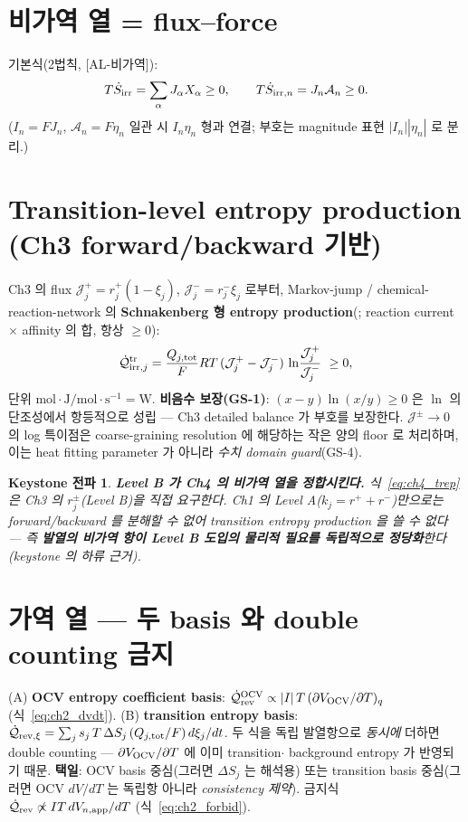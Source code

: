 \documentclass[11pt,a4paper]{article}
\newtheorem*{keybox}{Keystone 전파}
\newcommand{\rev}{\mathrm{rev}}\newcommand{\ct}{\mathrm{ct}}\newcommand{\AL}[1]{\textsf{[AL-#1]}}
\begin{document}
\section{비가역 열 = flux--force}\label{sec:ch4_irr}
기본식(2법칙, \AL{비가역}):
\begin{equation}
T\dot S_{\mathrm{irr}}=\sum_\alpha J_\alpha X_\alpha\ge0,\qquad
T\dot S_{\mathrm{irr},n}=J_n\mathcal A_n\ge0 .
\label{eq:ch4_JA}
\end{equation}
($I_n=FJ_n$, $\mathcal A_n=F\eta_n$ 일관 시 $I_n\eta_n$ 형과 연결; 부호는 magnitude 표현
$|I_n||\eta_n|$ 로 분리.)

\section{Transition-level entropy production (Ch3 forward/backward 기반)}\label{sec:ch4_trep}
Ch3 의 flux $\mathcal J_j^+=r_j^+(1-\xi_j)$, $\mathcal J_j^-=r_j^-\xi_j$ 로부터, Markov-jump / chemical-
reaction-network 의 \textbf{Schnakenberg 형 entropy production}(\cite{schnakenberg1976}; reaction current
$\times$ affinity 의 합, 항상 $\ge0$):
\begin{equation}
\dot{\mathcal Q}_{\mathrm{irr},j}^{\mathrm{tr}}=\frac{Q_{j,\mathrm{tot}}}{F}RT\,(\mathcal J_j^+-\mathcal J_j^-)\,
\ln\!\frac{\mathcal J_j^+}{\mathcal J_j^-}\ \ge 0,
\label{eq:ch4_trep}
\end{equation}
단위 $\mathrm{mol}\cdot\mathrm{J/mol}\cdot\mathrm{s^{-1}}=\mathrm W$. \textbf{비음수 보장(GS-1)}:
$(x-y)\ln(x/y)\ge0$ 은 $\ln$ 의 단조성에서 항등적으로 성립 — Ch3 detailed balance 가 부호를 보장한다.
$\mathcal J^\pm\to0$ 의 log 특이점은 coarse-graining resolution 에 해당하는 작은 양의 floor 로 처리하며,
이는 heat fitting parameter 가 아니라 \emph{수치 domain guard}(GS-4).

\begin{keybox}
\textbf{Level B 가 Ch4 의 비가역 열을 정합시킨다.} 식~\eqref{eq:ch4_trep} 은 Ch3 의 $r_j^\pm$(Level B)을
직접 요구한다. Ch1 의 Level A($k_j=r^++r^-$)만으로는 forward/backward 를 분해할 수 없어 transition
entropy production 을 쓸 수 없다 — 즉 \textbf{발열의 비가역 항이 Level B 도입의 물리적 필요를
독립적으로 정당화}한다(keystone 의 하류 근거).
\end{keybox}

\section{가역 열 — 두 basis 와 double counting 금지}\label{sec:ch4_double}
(A) \textbf{OCV entropy coefficient basis}: $\dot{\mathcal Q}_\rev^{\OCV}\propto |I|\,T\,(\partial V_\OCV/\partial T)_q$
(식~\eqref{eq:ch2_dvdt}). (B) \textbf{transition entropy basis}:
$\dot{\mathcal Q}_{\rev,\xi}=\sum_j s_j\,T\,\Delta S_j\,(Q_{j,\tot}/F)\,d\xi_j/dt$. 두 식을 독립
발열항으로 \emph{동시에} 더하면 double counting — $\partial V_{\mathrm{OCV}}/\partial T$ 에 이미 transition$\cdot$
background entropy 가 반영되기 때문. \textbf{택일}: OCV basis 중심(그러면 $\Delta S_j$ 는 해석용) 또는
transition basis 중심(그러면 OCV $dV/dT$ 는 독립항 아니라 \emph{consistency 제약}). 금지식
$\dot{\mathcal Q}_\rev\not\propto IT\,dV_{n,\app}/dT$ (식~\eqref{eq:ch2_forbid}).
\end{document}
